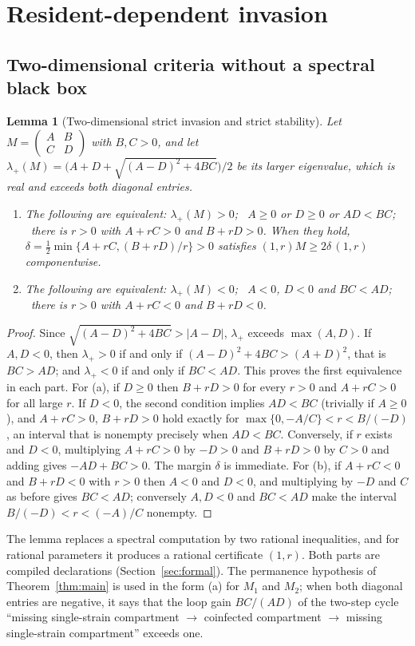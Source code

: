 \documentclass[11pt,a4paper]{article}
\theoremstyle{plain}
\newtheorem{lemma}[theorem]{Lemma}
\theoremstyle{definition}
\theoremstyle{remark}
\newcommand{\mat}[4]{\begin{pmatrix}#1&#2\\#3&#4\end{pmatrix}}
\begin{document}
\section{Resident-dependent invasion}\label{sec:invasion}

\subsection{Two-dimensional criteria without a spectral black box}

\begin{lemma}[Two-dimensional strict invasion and strict stability]\label{lem:covector}
Let $M=\mat ABCD$ with $B,C>0$, and let $\lambda_+(M)=\bigl(A+D+\sqrt{(A-D)^2+4BC}\bigr)/2$ be its larger eigenvalue, which is real and exceeds both diagonal entries.
\begin{enumerate}[label=(\alph*)]
\item The following are equivalent: $\lambda_+(M)>0$; \ $A\ge0$ or $D\ge0$ or $AD<BC$; \ there is $r>0$ with $A+rC>0$ and $B+rD>0$. When they hold, $\delta=\tfrac12\min\{A+rC,(B+rD)/r\}>0$ satisfies $(1,r)M\ge2\delta\,(1,r)$ componentwise.
\item The following are equivalent: $\lambda_+(M)<0$; \ $A<0$, $D<0$ and $BC<AD$; \ there is $r>0$ with $A+rC<0$ and $B+rD<0$.
\end{enumerate}
\end{lemma}
\begin{proof}
Since $\sqrt{(A-D)^2+4BC}>|A-D|$, $\lambda_+$ exceeds $\max(A,D)$. If $A,D<0$, then $\lambda_+>0$ if and only if $(A-D)^2+4BC>(A+D)^2$, that is $BC>AD$; and $\lambda_+<0$ if and only if $BC<AD$. This proves the first equivalence in each part. For (a), if $D\ge0$ then $B+rD>0$ for every $r>0$ and $A+rC>0$ for all large $r$. If $D<0$, the second condition implies $AD<BC$ (trivially if $A\ge0$), and $A+rC>0$, $B+rD>0$ hold exactly for $\max\{0,-A/C\}<r<B/(-D)$, an interval that is nonempty precisely when $AD<BC$. Conversely, if $r$ exists and $D<0$, multiplying $A+rC>0$ by $-D>0$ and $B+rD>0$ by $C>0$ and adding gives $-AD+BC>0$. The margin $\delta$ is immediate. For (b), if $A+rC<0$ and $B+rD<0$ with $r>0$ then $A<0$ and $D<0$, and multiplying by $-D$ and $C$ as before gives $BC<AD$; conversely $A,D<0$ and $BC<AD$ make the interval $B/(-D)<r<(-A)/C$ nonempty.
\end{proof}

The lemma replaces a spectral computation by two rational inequalities, and for rational parameters it produces a rational certificate $(1,r)$. Both parts are compiled declarations (Section~\ref{sec:formal}). The permanence hypothesis of Theorem~\ref{thm:main} is used in the form (a) for $M_1$ and $M_2$; when both diagonal entries are negative, it says that the loop gain $BC/(AD)$ of the two-step cycle ``missing single-strain compartment $\to$ coinfected compartment $\to$ missing single-strain compartment'' exceeds one.
\end{document}
